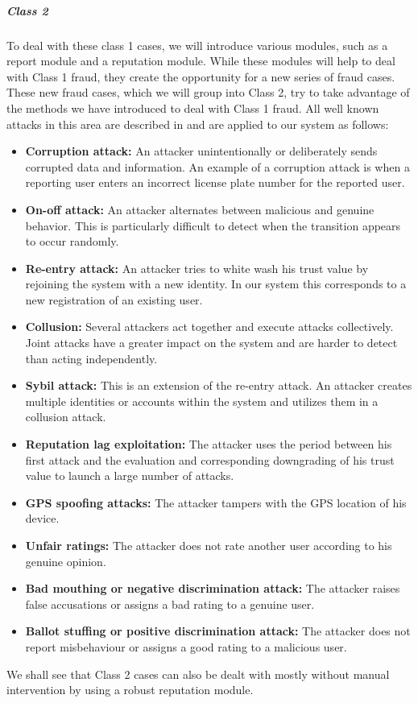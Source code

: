 \documentclass[
a4paper,     %
titlepage,   %
14pt         %
]{scrartcl}  %
\theoremstyle{mystyle}
\begin{document}
\subparagraph{Class 2} To deal with these class 1 cases, we will introduce various modules, such as a report module and a reputation module. While these modules will help to deal with Class 1 fraud, they create the opportunity for a new series of fraud cases. These new fraud cases, which we will group into Class 2, try to take advantage of the methods we have introduced to deal with Class 1 fraud. All well known attacks in this area are described in \cite{mousa2015trust} and are applied to our system as follows:
\begin{itemize}
\item \textbf{Corruption attack:} An attacker unintentionally or deliberately sends corrupted data and information. An example of a corruption attack is when a reporting user enters an incorrect license plate number for the reported user.
\item \textbf{On-off attack:} An attacker alternates between malicious and genuine behavior. This is particularly difficult to detect when the transition appears to occur randomly.
\item \textbf{Re-entry attack:} An attacker tries to white wash his trust value by rejoining the system with a new identity. In our system this corresponds to a new registration of an existing user.
\item \textbf{Collusion:} Several attackers act together and execute attacks collectively. Joint attacks have a greater impact on the system and are harder to detect than acting independently.
\item \textbf{Sybil attack:} This is an extension of the re-entry attack. An attacker creates multiple identities or accounts within the system and utilizes them in a collusion attack.
\item \textbf{Reputation lag exploitation:} The attacker uses the period between his first attack and the evaluation and corresponding downgrading of his trust value to launch a large number of attacks.
\item \textbf{GPS spoofing attacks:} The attacker tampers with the GPS location of his device.
\item \textbf{Unfair ratings:} The attacker does not rate another user according to his genuine opinion.
\item \textbf{Bad mouthing or negative discrimination attack:} The attacker raises false accusations or assigns a bad rating to a genuine user.
\item \textbf{Ballot stuffing or positive discrimination attack:} The attacker does not report misbehaviour or assigns a good rating to a malicious user.
\end{itemize}
We shall see that Class 2 cases can also be dealt with mostly without manual intervention by using a robust reputation module. 
\end{document}
